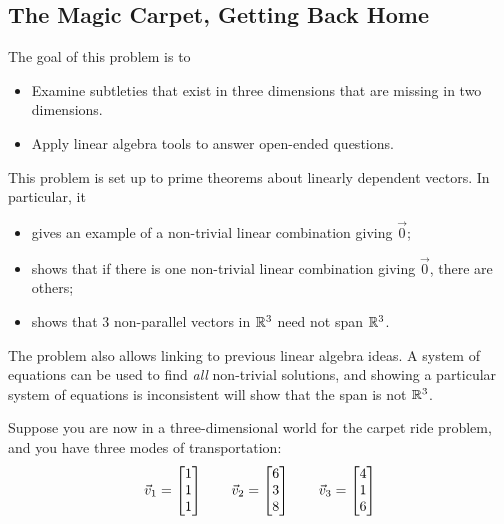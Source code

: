 \documentclass{workbook}
\begin{document}
\begin{iola}
\begin{slide}
\section*{The Magic Carpet, Getting Back Home}
\question
	\begin{annotation}
		\begin{goals}

			The goal of this problem is to
			\begin{itemize}
				\item Examine subtleties that exist in three dimensions that are
					missing in two dimensions.
				\item Apply linear algebra tools to answer open-ended questions.
			\end{itemize}
		\end{goals}

		\begin{notes}
			This problem is set up to prime
			theorems about linearly dependent vectors. In particular, it
			\begin{itemize}
				\item gives an example of a non-trivial linear combination giving $\vec 0$;
				\item shows that if there is one non-trivial linear combination giving $\vec 0$,
					there are others;
				\item shows that 3 non-parallel vectors in $\mathbb{R}^3$ need not span $\mathbb{R}^3$.
			\end{itemize}

			The problem also allows linking to previous linear algebra ideas. A system
			of equations can be used to find \emph{all} non-trivial solutions, and showing
			a particular system of equations is inconsistent will show that the span
			is not $\mathbb{R}^3$.
		\end{notes}
	\end{annotation}
Suppose you are now in a three-dimensional world for the carpet
ride problem, and you have three modes of transportation:
\[
	\vec v_1 = \mat{1 \\1 \\ 1}\qquad
	\vec v_2 = \mat{6 \\3 \\ 8}\qquad
	\vec v_3 = \mat{4 \\1 \\ 6}
\]


\end{slide}
\end{iola}
\end{document}
